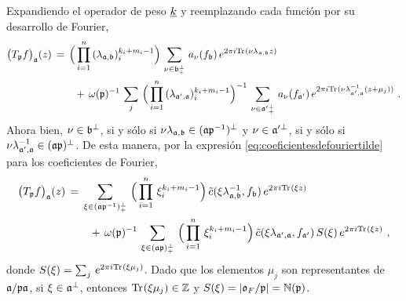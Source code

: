 %
Expandiendo el operador de peso $\peso{k}$ y reemplazando cada funci\'{o}n por
su desarrollo de Fourier,
\begin{align*}
	\big(T_{\frak{p}}f\big)_{\frak{a}}(z) & \,=\,\Big(\prod_{i=1}^{n}\,
		(\lambda_{\frak{a},\frak{b}})_{i}^{k_{i}+m_{i}-1}\Big)\,
		\sum_{\nu\in\frak{b}^{\perp}_{+}}\,a_{\nu}(f_{\frak{b}})\,
		e^{2\pi i\traza(\nu\lambda_{\frak{a},\frak{b}}z)} \\
	& \qquad\,+\,\omega(\frak{p})^{-1}\,\sum_{j}\,\Big(\prod_{i=1}^{n}\,
		(\lambda_{\frak{a}',\frak{a}})_{i}^{k_{i}+m_{i}-1}\Big)^{-1}\,
		\sum_{\nu\in\frak{a}'\null^{\perp}_{+}}\,
		a_{\nu}(f_{\frak{a}'})\,e^{2\pi i\traza(\nu%
			\lambda_{\frak{a}',\frak{a}}^{-1}(z+\mu_{j}))}
	\text{ .}
\end{align*}
%
Ahora bien, $\nu\in\frak{b}^{\perp}$, si y s\'{o}lo si
$\nu\lambda_{\frak{a},\frak{b}}\in(\frak{a}\frak{p}^{-1})^{\perp}$ y
$\nu\in\frak{a}'\null^{\perp}$, si y s\'{o}lo si
$\nu\lambda_{\frak{a}',\frak{a}}^{-1}\in(\frak{a}\frak{p})^{\perp}$. De esta
manera, por la expresi\'{o}n \eqref{eq:coeficientesdefouriertilde} para los
coeficientes de Fourier,
\begin{align*}
	\big(T_{\frak{p}}f\big)_{\frak{a}}(z) & \,=\,
		\sum_{\xi\in(\frak{a}\frak{p}^{-1})^{\perp}_{+}}\,
		\Big(\prod_{i=1}^{n}\,\xi_{i}^{k_{i}+m_{i}-1}\Big)\,
		\tilde{c}(\xi\lambda_{\frak{a},\frak{b}}^{-1},f_{\frak{b}})\,
		e^{2\pi i\traza(\xi z)} \\
	& \qquad\,+\,\omega(\frak{p})^{-1}\,
		\sum_{\xi\in(\frak{a}\frak{p})^{\perp}_{+}}\,
		\Big(\prod_{i=1}^{n}\,\xi_{i}^{k_{i}+m_{i}-1}\Big)\,
		\tilde{c}(\xi\lambda_{\frak{a}',\frak{a}},f_{\frak{a}'})\,
		S(\xi)\,e^{2\pi i\traza(\xi z)}
	\text{ ,}
\end{align*}
%
donde $S(\xi)=\sum_{j}\,e^{2\pi i\traza(\xi\mu_{j})}$. Dado que los elementos
$\mu_{j}$ son representantes de $\frak{a}/\frak{p}\frak{a}$, si
$\xi\in\frak{a}^{\perp}$, entonces $\traza(\xi\mu_{j})\in\bb{Z}$ y
$S(\xi)=|\oka{F}/\frak{p}|=\idnorm(\frak{p})$.


